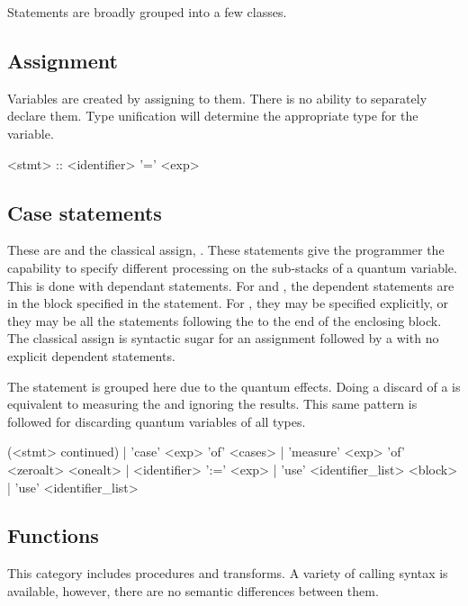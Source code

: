 Statements are broadly grouped into a few classes.
\subsection{Assignment} 
Variables are created by assigning to them. There is no 
ability to separately declare them. Type unification will determine the
appropriate type for the variable.

\begin{singlespace}
\begin{bnf}   
   <stmt> :: <identifier> '=' <exp>
\end{bnf}
\end{singlespace}

\subsection{Case statements} 
These are  and
the classical assign, \inlqpl{:=}. 
These statements give the programmer the capability to
specify different processing on the sub-stacks of
a quantum variable. This is done with dependant statements. 
For   
and ,
the dependent statements are in the block specified in the 
statement. For , they may be
specified explicitly, or they may be all the 
statements following the  to the end
of the enclosing block. The classical assign is syntactic sugar for an
assignment followed by a  with no explicit dependent statements.

The  statement is grouped here due to the quantum effects.
Doing a discard of a \qbit{} is equivalent to measuring the \qbit{} and 
ignoring the results. This same pattern is followed for discarding 
quantum variables of all types.

\begin{singlespace}
\begin{bnf} 
   (<stmt> continued)    
        | 'case' <exp> 'of' <cases>  
        | 'measure' <exp> 'of' <zeroalt> <onealt> 
	| <identifier> ':=' <exp>
        | 'use' <identifier_list> <block>
        | 'use' <identifier_list> 
\end{bnf}
\end{singlespace}

\subsection{Functions} 
This category includes procedures and
transforms. A variety of calling syntax is available, however, there
are no semantic differences between them.

